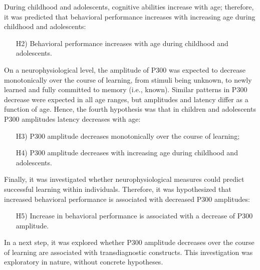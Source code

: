 During childhood and adolescents, cognitive abilities increase with age; therefore, it was predicted that behavioral performance increases with increasing age during childhood and adolescents: 

\begin{itemize}
    \item[H2)] Behavioral performance increases with age during childhood and adolescents. 
\end{itemize}


On a neurophysiological level, the amplitude of P300 was expected to decrease monotonically over the course of learning, from stimuli being unknown, to newly learned and fully committed to memory (i.e., known). Similar patterns in P300 decrease were expected in all age ranges, but amplitudes and latency differ as a function of age. Hence, the fourth hypothesis was that in children and adolescents P300 amplitudes latency decreases with age:

\begin{itemize}
    \item[H3)] P300 amplitude decreases monotonically over the course of learning;
    \item[H4)] P300 amplitude decreases with increasing age during childhood and adolescents.
\end{itemize}


Finally, it was investigated whether neurophysiological measures could predict successful learning within individuals. Therefore, it was hypothesized that increased behavioral performance is associated with decreased P300 amplitudes: 
\begin{itemize}
    \item[H5)] Increase in behavioral performance is associated with a decrease of P300 amplitude. 
\end{itemize}

In a next step, it was explored whether P300 amplitude decreases over the course of learning are associated with transdiagnostic constructs. This investigation was exploratory in nature, without concrete hypotheses. 
